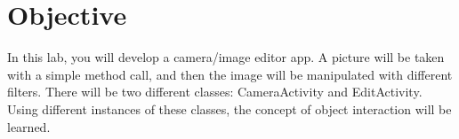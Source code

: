 \section{Objective}

In this lab, you will develop a camera/image editor app. A picture will be taken with a simple method call, and then the image will be manipulated with different filters. There will be two different classes: CameraActivity and EditActivity. Using different instances of these classes, the concept of object interaction will be learned.
